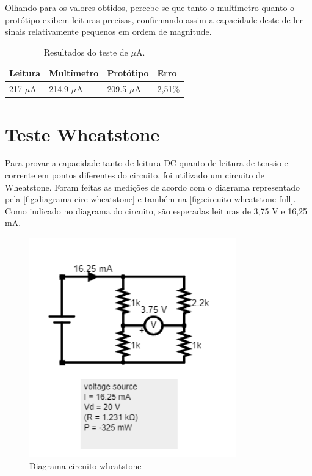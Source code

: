 Olhando para os valores obtidos, percebe-se que tanto o multímetro quanto o protótipo exibem leituras precisas, confirmando assim a capacidade deste de ler sinais relativamente pequenos em ordem de magnitude.

\begin{table}[!ht]
    \centering
    \caption{Resultados do teste de $\mu$A.}
    \label{tab:resultados-ua}
    \begin{tabular}{|l|l|l|l|}
        \hline
        \textbf{Leitura}  & \textbf{Multímetro}  & \textbf{Protótipo}  & \textbf{Erro}   \\ \hline
        217 $\mu$A        & 214.9 $\mu$A         & 209.5 $\mu$A        & 2,51\%             \\ \hline
    \end{tabular}
    \fonte{}
\end{table}

\section{Teste Wheatstone}\label{teste-Wheatstone}

Para provar a capacidade tanto de leitura DC quanto de leitura de tensão e corrente em pontos diferentes do circuito, foi utilizado um circuito de Wheatstone. Foram feitas as medições de acordo com o diagrama representado pela \autoref{fig:diagrama-circ-wheatstone} e também na \autoref{fig:circuito-wheatstone-full}. Como indicado no diagrama do circuito, são esperadas leituras de 3,75 V e 16,25 mA.

\begin{figure}[htb!]
    \caption{Diagrama circuito wheatstone}
    \label{fig:diagrama-circ-wheatstone}
    \includegraphics[width=0.8\textwidth]{figuras/diagrama-circ-wheatstone.png}
    \fonte{}
\end{figure}

